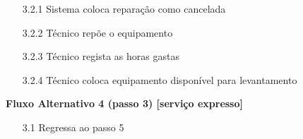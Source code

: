 \documentclass[../relatorio.tex]{subfiles}
\begin{document}
\begin{itemize}
\begin{flushleft}
          \end{flushleft}
          \begin{itemize}
              \item[3.2.1]{Sistema coloca reparação como cancelada}
              \item[3.2.2]{Técnico repõe o equipamento}
              \item[3.2.3]{Técnico regista as horas gastas}
              \item[3.2.4]{Técnico coloca equipamento disponível para levantamento}
          \end{itemize}
          \begin{flushleft}
              \textbf{Fluxo Alternativo 4 (passo 3) [serviço expresso]}
          \end{flushleft}
          \begin{itemize}
              \item[3.1]{Regressa ao passo 5}
          \end{itemize}
\end{itemize}
\end{document}
